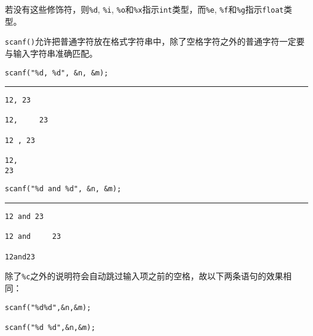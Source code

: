 \begin{frame}[fragile]
  若没有这些修饰符，则\lstinline|%d|, \lstinline|%i|, \lstinline|%o|和\lstinline|%x|指示\lstinline|int|类型，而\lstinline|%e|, \lstinline|%f|和\lstinline|%g|指示\lstinline|float|类型。
\end{frame}

\begin{frame}[fragile]
  \lstinline|scanf()|允许把普通字符放在格式字符串中，除了空格字符之外的普通字符一定要与输入字符串准确匹配。  
\end{frame}

\begin{frame}[fragile]
\begin{lstlisting}[showspaces=true,backgroundcolor=\color{red!20}]
scanf("%d, %d", &n, &m);
\end{lstlisting}

\rule{\textwidth}{0.1em}
\begin{lstlisting}[title=合法的输入方式,showspaces=true,backgroundcolor=\color{red!20}]
12, 23

12,     23

12 , 23

12,
23
\end{lstlisting}

\end{frame}

\begin{frame}[fragile]
\begin{lstlisting}[showspaces=true,backgroundcolor=\color{red!20}]
scanf("%d and %d", &n, &m);
\end{lstlisting}

\rule{\textwidth}{0.1em}
\begin{lstlisting}[title=合法的输入方式,showspaces=true,backgroundcolor=\color{red!20}]
12 and 23

12 and     23

12and23
\end{lstlisting}
\end{frame}

\begin{frame}[fragile]

除了\lstinline|%c|之外的说明符会自动跳过输入项之前的空格，故以下两条语句的效果相同：
\begin{lstlisting}[showspaces=true,backgroundcolor=\color{red!10}]
scanf("%d%d",&n,&m);

scanf("%d %d",&n,&m);
\end{lstlisting}
\end{frame}

